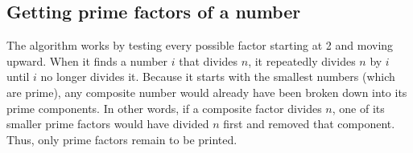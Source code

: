 \documentclass{report}
\begin{document}
\subsection{Getting prime factors of a number}
\bigbreak \noindent 
{}
\bigbreak \noindent 
The algorithm works by testing every possible factor starting at 2 and moving upward. When it finds a number $i$ that divides $n$, it repeatedly divides $n$ by $i$ until $i$ no longer divides it. Because it starts with the smallest numbers (which are prime), any composite number would already have been broken down into its prime components. In other words, if a composite factor divides $n$, one of its smaller prime factors would have divided $n$ first and removed that component. Thus, only prime factors remain to be printed.
\end{document}
